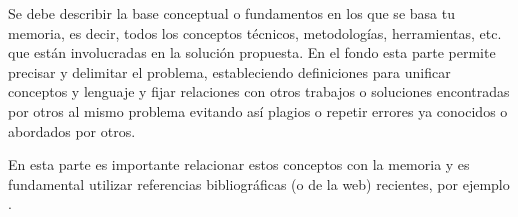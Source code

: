
Se debe describir la base conceptual o fundamentos en los que se basa tu memoria, es decir, todos los conceptos técnicos, metodologías, herramientas, etc. que están involucradas en la solución propuesta. En el fondo esta parte permite precisar y delimitar el problema, estableciendo definiciones para unificar conceptos y lenguaje y fijar relaciones con otros trabajos o soluciones encontradas por otros al mismo problema evitando así plagios o repetir errores ya conocidos o abordados por otros.

En esta parte es importante relacionar estos conceptos con la memoria y es fundamental utilizar referencias bibliográficas (o de la web) recientes, por ejemplo \cite{gettelfinger2004will}.
